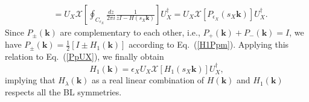 \documentclass{tADP2e}
\theoremstyle{plain}
\theoremstyle{plain}
\theoremstyle{definition}
\begin{document}
\begin{appendices}
\begin{equation}
\begin{split}
&=U_X\mathcal{X}\left[\oint_{C_{\epsilon_X}}\frac{dz}{2\pi i}\frac{1}{zI-H(s_X\boldsymbol{k})}\right]U_X^\dag=U_X\mathcal{X}[P_{\epsilon_X}(s_X\boldsymbol{k})]U_X^\dag.
\end{split}
\label{PpUX}
\end{equation}
Since $P_\pm(\boldsymbol{k})$ are complementary to each other, i.e., $P_+(\boldsymbol{k})+P_-(\boldsymbol{k})=I$, we have $P_\pm(\boldsymbol{k})=\frac{1}{2}[I\pm H_1(\boldsymbol{k})]$ according to Eq.~(\ref{H1Ppm}). Applying this relation to Eq.~(\ref{PpUX}), we finally obtain
\begin{equation}
H_1(\boldsymbol{k})=\epsilon_XU_X \mathcal{X}[H_1(s_X\boldsymbol{k})]U_X^\dag,
\end{equation}
implying that $H_\lambda(\boldsymbol{k})$ as a real linear combination of $H(\boldsymbol{k})$ and $H_1(\boldsymbol{k})$ respects all the BL symmetries.


\end{appendices}
\end{document}
